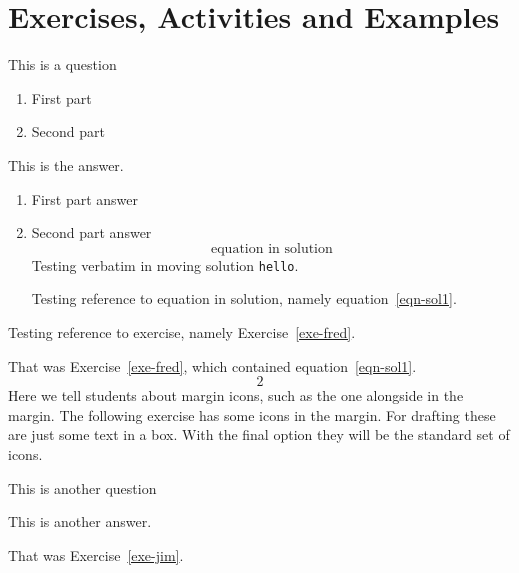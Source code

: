 \documentclass[solutionsatend,twocolumnsolutions]{ouunit}
\begin{document}
\section{Exercises, Activities and Examples}
\lipsum[134]
\begin{exercise}
\label{exe-fred}
This is a question
\begin{enumerate}
\item First part
\item Second part
\end{enumerate}
\begin{solution}
This is the answer.
\begin{enumerate}
\item First part answer
\item Second part answer
\begin{equation}
\text{equation in solution} \label{eqn-sol1}
\end{equation}
Testing verbatim in moving solution \verb"hello".

Testing reference to equation in solution, namely equation~\ref{eqn-sol1}.

\end{enumerate}
\end{solution}
\noendrule
\end{exercise}
Testing reference to exercise, namely Exercise~\ref{exe-fred}.

\begin{exercise}
\lipsum[133]
\begin{solution}
\lipsum[133]
\end{solution}
\noendrule
\end{exercise}
\begin{exercise}
\lipsum[133]
\begin{solution}
\lipsum[133]
\end{solution}
\end{exercise}
That was Exercise~\ref{exe-fred}, which contained equation~\ref{eqn-sol1}.
\begin{equation}
2
\end{equation}
Here we tell students about margin icons, such as the one alongside in the margin. The following exercise has some icons in the margin. For drafting these are just some text in a box. With the final option they will be the standard set of icons.

\begin{exercise}\label{exe-jim}
This is another question
\begin{solution}
This is another answer.
\end{solution}
\end{exercise}
That was Exercise~\ref{exe-jim}. 
\end{document}
